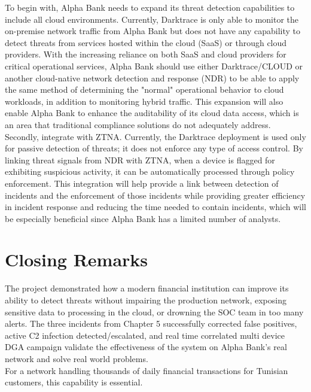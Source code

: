 \documentclass[12pt,a4paper]{report}
\begin{document}
To begin with, Alpha Bank needs to expand its threat detection capabilities to include all cloud environments. Currently, Darktrace is only able to monitor the on-premise network traffic from Alpha Bank but does not have any capability to detect threats from services hosted within the cloud (SaaS) or through cloud providers. With the increasing reliance on both SaaS and cloud providers for critical operational services, Alpha Bank should use either Darktrace/CLOUD or another cloud-native network detection and response (NDR) to be able to apply the same method of determining the "normal" operational behavior to cloud workloads, in addition to monitoring hybrid traffic. This expansion will also enable Alpha Bank to enhance the auditability of its cloud data access, which is an area that traditional compliance solutions do not adequately address.\\

Secondly, integrate with ZTNA. Currently, the Darktrace deployment is used only for passive detection of threats; it does not enforce any type of access control. By linking threat signals from NDR with ZTNA, when a device is flagged for exhibiting suspicious activity, it can be automatically processed through policy enforcement. This integration will help provide a link between detection of incidents and the enforcement of those incidents while providing greater efficiency in incident response and reducing the time needed to contain incidents, which will be especially beneficial since Alpha Bank has a limited number of analysts.

\section*{Closing Remarks}
The project demonstrated how a modern financial institution can improve its ability to detect threats without impairing the production network, exposing sensitive data to processing in the cloud, or drowning the SOC team in too many alerts. The three incidents from Chapter 5 successfully corrected false positives, active C2 infection detected/escalated, and real time correlated multi device DGA campaign validate the effectiveness of the system on Alpha Bank's real network and solve real world problems.\\For a network handling thousands of daily financial transactions for Tunisian customers, this capability is essential.
\end{document}
